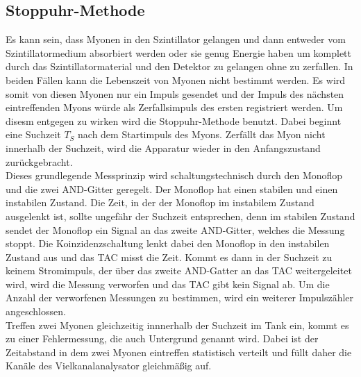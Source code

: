 \subsection{Stoppuhr-Methode}
\label{subsec:Messmethode}
Es kann sein, dass Myonen in den Szintillator gelangen und dann entweder vom Szintillatormedium absorbiert werden oder sie genug 
Energie haben um komplett durch das Szintillatormaterial und den Detektor zu gelangen ohne zu zerfallen.
In beiden Fällen kann die Lebenszeit von Myonen nicht bestimmt werden.
Es wird somit von diesen Myonen nur ein Impuls gesendet und der Impuls des nächsten eintreffenden Myons würde als Zerfallsimpuls des ersten
registriert werden. Um disesm entgegen zu wirken
wird die Stoppuhr-Methode benutzt. Dabei beginnt eine Suchzeit $T_S$ nach dem Startimpuls des Myons. Zerfällt das Myon nicht innerhalb der Suchzeit,
wird die Apparatur wieder in den Anfangszustand zurückgebracht.\\
Dieses grundlegende Messprinzip wird schaltungstechnisch durch den Monoflop und die zwei AND-Gitter geregelt.
Der Monoflop hat einen stabilen und einen instabilen Zustand.
Die Zeit, in der der Monoflop im instabilem Zustand ausgelenkt ist, sollte ungefähr der Suchzeit entsprechen, denn im stabilen Zustand sendet
der Monoflop ein Signal an das zweite AND-Gitter, welches die Messung stoppt.
Die Koinzidenzschaltung lenkt dabei den Monoflop in den instabilen Zustand aus und das TAC misst die Zeit. Kommt es dann in der Suchzeit zu keinem
Stromimpuls, der über das zweite AND-Gatter an das TAC weitergeleitet wird, wird die Messung verworfen und das TAC gibt kein Signal ab.
Um die Anzahl der verworfenen Messungen zu bestimmen, wird ein weiterer Impulszähler angeschlossen.\\
Treffen zwei Myonen gleichzeitig innnerhalb der Suchzeit im Tank ein, kommt es zu einer Fehlermessung, die auch Untergrund genannt wird.
Dabei ist der Zeitabstand in dem zwei Myonen eintreffen statistisch verteilt und füllt daher die Kanäle des Vielkanalanalysator gleichmäßig auf.

